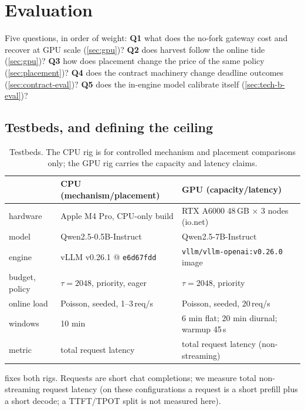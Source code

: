 \documentclass[11pt]{article}
\newcommand{\code}[1]{\texttt{#1}}
\begin{document}
\section{Evaluation}
\label{sec:eval}

Five questions, in order of weight: \textbf{Q1} what does the no-fork gateway cost and
recover at GPU scale (\cref{sec:gpu})? \textbf{Q2} does harvest follow the online tide
(\cref{sec:gpu})? \textbf{Q3} how does placement change the price of the same policy
(\cref{sec:placement})? \textbf{Q4} does the contract machinery change deadline outcomes
(\cref{sec:contract-eval})? \textbf{Q5} does the in-engine model calibrate itself
(\cref{sec:tech-b-eval})?

\subsection{Testbeds, and defining the ceiling}
\label{sec:ceiling}

\begin{table}[t]
\centering
\small
\caption{Testbeds. The CPU rig is for controlled mechanism and placement comparisons
only; the GPU rig carries the capacity and latency claims.}
\label{tab:testbeds}
\begin{tabular}{lll}
\toprule
 & CPU (mechanism/placement) & GPU (capacity/latency) \\
\midrule
hardware & Apple M4 Pro, CPU-only build & RTX A6000 48\,GB $\times$ 3 nodes (io.net) \\
model & Qwen2.5-0.5B-Instruct & Qwen2.5-7B-Instruct \\
engine & vLLM v0.26.1 @ \code{e6d67fdd} & \code{vllm/vllm-openai:v0.26.0} image \\
budget, policy & $\tau{=}2048$, priority, eager & $\tau{=}2048$, priority \\
online load & Poisson, seeded, 1--3\,req/s & Poisson, seeded, 20\,req/s \\
windows & 10 min & 6 min flat; 20 min diurnal; warmup 45\,s \\
metric & total request latency & total request latency (non-streaming) \\
\bottomrule
\end{tabular}
\end{table}

 fixes both rigs. Requests are short chat completions; we measure
total non-streaming request latency (on these configurations a request is a short prefill
plus a short decode; a TTFT/TPOT split is not measured here).
\end{document}
